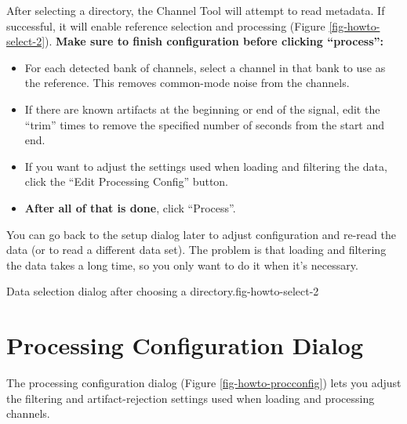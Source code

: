 After selecting a directory, the Channel Tool will attempt to read metadata.
If successful, it will enable reference selection and processing
(Figure \ref{fig-howto-select-2}).
\textbf{Make sure to finish configuration before clicking ``process'':}
\begin{itemize}
\item For each detected bank of channels, select a channel in that bank to
use as the reference. This removes common-mode noise from the channels.
\item If there are known artifacts at the beginning or end of the signal,
edit the ``trim'' times to remove the specified number of seconds from the
start and end.
\item If you want to adjust the settings used when loading and filtering the
data, click the ``Edit Processing Config'' button.
\item \textbf{After all of that is done}, click ``Process''.
\end{itemize}
You can go back to the setup dialog later to adjust configuration and re-read
the data (or to read a different data set). The problem is that loading and
filtering the data takes a long time, so you only want to do it when it's
necessary.

{Data selection dialog after choosing a directory.}{fig-howto-select-2}

%
%
\clearpage
\section{Processing Configuration Dialog}
\label{sect-howto-procconfig}

The processing configuration dialog (Figure \ref{fig-howto-procconfig}) lets
you adjust the filtering and artifact-rejection settings used when loading
and processing channels.

